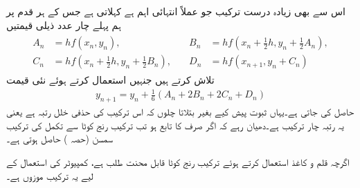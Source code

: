 اس سے بھی زیادہ درست ترکیب جو عملاً انتہائی اہم ہے  کہلاتی ہے جس کے ہر قدم پر ہم پہلے چار عدد ذیلی قیمتیں
\begin{gather}
\begin{aligned}\label{مساوات_اعدادی_رنج_کوٹا_الف}
A_n&=hf(x_n,y_n),\\
C_n&=hf(x_n+\tfrac{1}{2}h,y_n+\tfrac{1}{2}B_n),
\end{aligned}
\quad 
\begin{aligned}
B_n&=hf(x_n+\tfrac{1}{2}h,y_n+\tfrac{1}{2}A_n),\\
D_n&=hf(x_{n+1},y_n+C_n)
\end{aligned}
\end{gather}
 تلاش کرتے ہیں جنہیں استعمال کرتے ہوئے نئی قیمت
\begin{align}\label{مثال_اعدادی_ترکیب_یولر_ب}
y_{n+1}=y_n+\tfrac{1}{6}(A_n+2B_n+2C_n+D_n)
\end{align}
حاصل کی جاتی ہے۔یہاں ثبوت پیش کیے بغیر بتلاتا چلوں کہ اس ترکیب کی حذفی خلل رتبہ  ہے یعنی یہ رتبہ چار ترکیب  ہے۔دھیان رہے کہ اگر  صرف  کا تابع ہو تب ترکیب رنج کوٹا سے تکمل کی ترکیب سمسن (حصہ ) حاصل ہوتی ہے۔

اگرچہ قلم و کاغذ استعمال کرتے ہوئے ترکیب رنج کوٹا قابل محنت طلب ہے، کمپیوٹر کی استعمال کے لیے یہ ترکیب موزوں ہے۔

